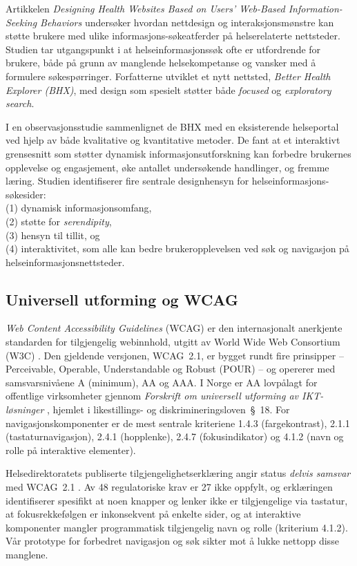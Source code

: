 Artikkelen \textit{Designing Health Websites Based on Users’ Web-Based Information-Seeking Behaviors} undersøker hvordan nettdesign og interaksjonsmønstre kan støtte brukere med ulike informasjons-søkeatferder på helserelaterte nettsteder. Studien tar utgangspunkt i at helseinformasjonssøk ofte er utfordrende for brukere, både på grunn av manglende helsekompetanse og vansker med å formulere søkespørringer. Forfatterne utviklet et nytt nettsted, \textit{Better Health Explorer (BHX)}, med design som spesielt støtter både \textit{focused} og \textit{exploratory search}. 

I en observasjonsstudie sammenlignet de BHX med en eksisterende helseportal ved hjelp av både kvalitative og kvantitative metoder. De fant at et interaktivt grensesnitt som støtter dynamisk informasjonsutforskning kan forbedre brukernes opplevelse og engasjement, øke antallet undersøkende handlinger, og fremme læring. Studien identifiserer fire sentrale designhensyn for helseinformasjons-søkesider: \\(1) dynamisk informasjonsomfang, \\(2) støtte for \textit{serendipity}, \\(3) hensyn til tillit, og \\(4) interaktivitet, som alle kan bedre brukeropplevelsen ved søk og navigasjon på helseinformasjonsnettsteder.

\cite{pang2016designing}

\subsection{Universell utforming og WCAG}
\label{sec:wcag-teori}

\textit{Web Content Accessibility Guidelines} (WCAG) er den internasjonalt
anerkjente standarden for tilgjengelig webinnhold, utgitt av World Wide Web
Consortium (W3C) \cite{wcag21}. Den gjeldende versjonen, WCAG~2.1, er bygget
rundt fire prinsipper -- Perceivable, Operable, Understandable og Robust
(POUR) -- og opererer med samsvarsnivåene A (minimum), AA og AAA. I Norge er
AA lovpålagt for offentlige virksomheter gjennom \textit{Forskrift om
universell utforming av IKT-løsninger} \cite{lovdata-uu}, hjemlet i
likestillings- og diskrimineringsloven~§~18. For navigasjonskomponenter er
de mest sentrale kriteriene 1.4.3 (fargekontrast), 2.1.1
(tastaturnavigasjon), 2.4.1 (hopplenke), 2.4.7 (fokusindikator) og
4.1.2 (navn og rolle på interaktive elementer).

Helsedirektoratets publiserte tilgjengelighetserklæring angir status
\textit{delvis samsvar} med WCAG~2.1 \cite{uustatus-helsedir}. Av
48 regulatoriske krav er 27 ikke oppfylt, og erklæringen identifiserer
spesifikt at noen knapper og lenker ikke er tilgjengelige via tastatur,
at fokusrekkefølgen er inkonsekvent på enkelte sider, og at interaktive
komponenter mangler programmatisk tilgjengelig navn og rolle (kriterium
4.1.2). Vår prototype for forbedret navigasjon og søk sikter mot å lukke
nettopp disse manglene.
